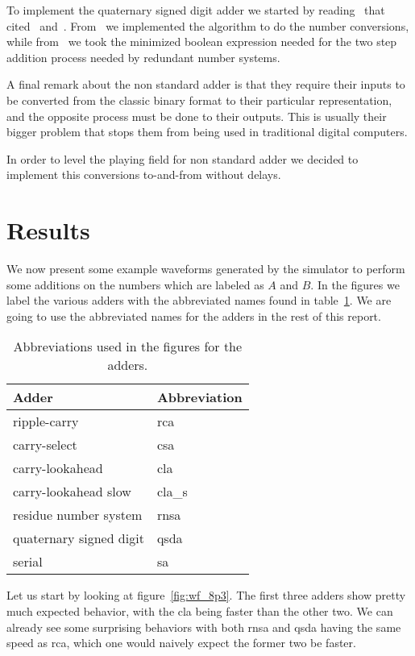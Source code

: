 \documentclass{article}
\begin{document}
To implement the quaternary signed digit adder we started by
reading~\cite{qsd_blog} that cited~\cite{qsd1} and~\cite{qsd2}. From~\cite{qsd1}
we implemented the algorithm to do the number conversions, while
from~\cite{qsd2} we took the minimized boolean expression needed for the two
step addition process needed by redundant number systems.

A final remark about the non standard adder is that they require their inputs to
be converted from the classic binary format to their particular representation,
and the opposite process must be done to their outputs. This is usually their
bigger problem that stops them from being used in traditional digital computers.

In order to level the playing field for non standard adder we decided to
implement this conversions to-and-from without delays.

\section{Results}

We now present some example waveforms generated by the simulator to perform some
additions on the numbers which are labeled as $A$ and $B$. In the figures we
label the various adders with the abbreviated names found in
table~\ref{tab:abbreviations}. We are going to use the abbreviated names for the
adders in the rest of this report.

\begin{table}
\centering
\begin{tabular}{|l|l|}
\hline \textbf{Adder} & \textbf{Abbreviation} \\
\hline ripple-carry & rca \\
\hline carry-select & csa \\
\hline carry-lookahead & cla \\
\hline carry-lookahead slow & cla\_s \\
\hline residue number system & rnsa \\
\hline quaternary signed digit & qsda \\
\hline serial & sa \\
\hline
\end{tabular}
\caption{Abbreviations used in the figures for the adders.}
\label{tab:abbreviations}
\end{table}

Let us start by looking at figure~\ref{fig:wf_8p3}. The first three adders show
pretty much expected behavior, with the cla being faster than the other two.
We can already see some surprising behaviors with both rnsa and qsda having the
same speed as rca, which one would naively expect the former two be faster.
\end{document}
